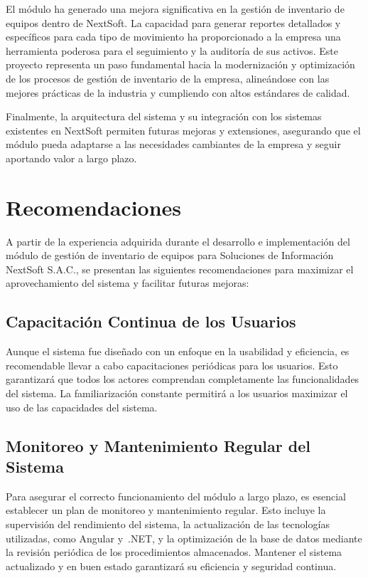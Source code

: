 \documentclass[stu, 12pt, letterpaper, donotrepeattitle, floatsintext, natbib]{apa7}
\begin{document}
El módulo ha generado una mejora significativa en la gestión de inventario de equipos dentro de NextSoft. La capacidad para generar reportes
detallados y específicos para cada tipo de movimiento ha proporcionado a la empresa una herramienta poderosa para el seguimiento y la auditoría
de sus activos. Este proyecto representa un paso fundamental hacia la modernización y optimización de los procesos de gestión de inventario de
la empresa, alineándose con las mejores prácticas de la industria y cumpliendo con altos estándares de calidad.

Finalmente, la arquitectura del sistema y su integración con los sistemas existentes en NextSoft permiten futuras mejoras y extensiones,
asegurando que el módulo pueda adaptarse a las necesidades cambiantes de la empresa y seguir aportando valor a largo plazo.
\newpage
\section{Recomendaciones}
A partir de la experiencia adquirida durante el desarrollo e implementación del módulo de gestión de inventario de equipos para Soluciones de
Información NextSoft S.A.C., se presentan las siguientes recomendaciones para maximizar el aprovechamiento del sistema y facilitar futuras
mejoras:
\subsection{Capacitación Continua de los Usuarios}
Aunque el sistema fue diseñado con un enfoque en la usabilidad y eficiencia, es recomendable llevar a cabo capacitaciones periódicas para los
usuarios. Esto garantizará que todos los actores comprendan completamente las funcionalidades del sistema. La familiarización constante
permitirá a los usuarios maximizar el uso de las capacidades del sistema.
\subsection{Monitoreo y Mantenimiento Regular del Sistema}
Para asegurar el correcto funcionamiento del módulo a largo plazo, es esencial establecer un plan de monitoreo y mantenimiento regular. Esto
incluye la supervisión del rendimiento del sistema, la actualización de las tecnologías utilizadas, como Angular y~.NET, y la optimización de
la base de datos mediante la revisión periódica de los procedimientos almacenados. Mantener el sistema actualizado y en buen estado garantizará
su eficiencia y seguridad continua.
\end{document}
